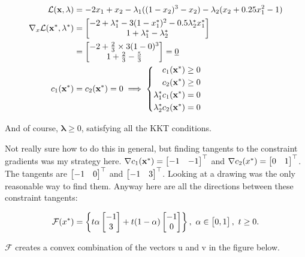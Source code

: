 \begin{align*}
  \mathcal{L}(\mathbf{x, \lambda})              & = -2x_1 + x_2 - \lambda_1((1-x_2)^3-x_2) - \lambda_2(x_2 + 0.25x_1^2-1) \\
  \nabla _x\mathcal{L}(\mathbf{x^*, \lambda^*}) & = \begin{bmatrix} -2 + \lambda_1^* -3(1-x_1^*)^2 -0.5\lambda_2^*x_1^*                \\ 1 + \lambda_1^*-\lambda_2^* \end{bmatrix} \\
                                                & = \begin{bmatrix} -2+ \frac{2}{3} \times 3(1-0)^3                                    \\ 1 + \frac{2}{3}- \frac{5}{3} \end{bmatrix} = \underline{0} \\
  c_1(\mathbf{x^*})                             & = c_2(\mathbf{x^*}) = 0 \implies
  \left\{
  \begin{aligned}
    c_1(\mathbf{x^*})  \geq 0        \\
    c_2(\mathbf{x^*})  \geq 0        \\
    \lambda_1^*c_1(\mathbf{x^*}) = 0 \\
    \lambda_2^*c_2(\mathbf{x^*}) = 0
  \end{aligned}
  \right.
\end{align*}

And of course, $\mathbf{\lambda}  \geq 0$, satisfying all the KKT conditions.


Not really sure how to do this in general, but finding tangents to the constraint gradients was my strategy here.
$\nabla c_1(\mathbf{x^*}) = \begin{bmatrix} -1 & -1 \end{bmatrix}^{\top}$ and $\nabla c_2(x^*) = \begin{bmatrix} 0 & 1 \end{bmatrix}^{\top}$. The tangents are $\begin{bmatrix} -1 & 0 \end{bmatrix}^{\top}$ and $\begin{bmatrix} -1 & 3 \end{bmatrix}^{\top}$. Looking at
a drawing was the only reasonable way to find them. Anyway here are all the directions between these constraint tangents:

\[
  \mathcal{F}(x^*) = \left\{
  t\alpha \begin{bmatrix} -1 \\ 3 \end{bmatrix} + t(1-\alpha)\begin{bmatrix} -1 \\ 0 \end{bmatrix}
  \right\},\  \alpha\in \begin{bmatrix} 0,1 \end{bmatrix},\ t  \geq 0
.\]

$\mathcal{F}$ creates a convex combination of the vectors u and v in the figure below.

